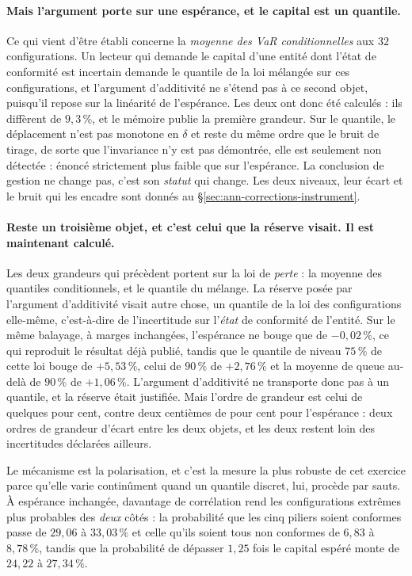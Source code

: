 \paragraph{Mais l'argument porte sur une espérance, et le capital est un quantile.} Ce qui vient
d'être établi concerne la \emph{moyenne des VaR conditionnelles} aux $32$ configurations. Un
lecteur qui demande le capital d'une entité dont l'état de conformité est incertain demande le
quantile de la loi mélangée sur ces configurations, et l'argument d'additivité ne
s'étend pas à ce second objet, puisqu'il repose sur la linéarité de l'espérance. Les deux ont
donc été calculés : ils diffèrent de $9{,}3\,\%$, et le mémoire publie la première
grandeur. Sur le quantile, le déplacement n'est pas monotone en $\delta$ et reste du même ordre
que le bruit de tirage, de sorte que l'invariance n'y est pas démontrée, elle est
seulement non détectée : énoncé strictement plus faible que sur l'espérance. La conclusion de
gestion ne change pas, c'est son \emph{statut} qui change. Les deux niveaux, leur écart et le
bruit qui les encadre sont donnés au \S\ref{sec:ann-corrections-instrument}.

\paragraph{Reste un troisième objet, et c'est celui que la réserve visait. Il est maintenant
calculé.} Les deux grandeurs qui précèdent portent sur la loi de \emph{perte} : la moyenne des
quantiles conditionnels, et le quantile du mélange. La réserve posée par l'argument d'additivité
visait autre chose, un quantile de la loi des configurations elle-même, c'est-à-dire de
l'incertitude sur l'\emph{état} de conformité de l'entité. Sur le même balayage, à marges
inchangées, l'espérance ne bouge que de $-0{,}02\,\%$, ce qui reproduit le résultat déjà publié,
tandis que le quantile de niveau $75\,\%$ de cette loi bouge de $+5{,}53\,\%$, celui de $90\,\%$
de $+2{,}76\,\%$ et la moyenne de queue au-delà de $90\,\%$ de $+1{,}06\,\%$. L'argument
d'additivité ne transporte donc pas à un quantile, et la réserve était justifiée. Mais l'ordre
de grandeur est celui de quelques pour cent, contre deux centièmes de pour cent pour l'espérance :
deux ordres de grandeur d'écart entre les deux objets, et les deux restent loin des incertitudes
déclarées ailleurs.

Le mécanisme est la polarisation, et c'est la mesure la plus robuste de cet exercice
parce qu'elle varie continûment quand un quantile discret, lui, procède par sauts. À espérance
inchangée, davantage de corrélation rend les configurations extrêmes plus probables des
\emph{deux} côtés : la probabilité que les cinq piliers soient conformes passe de $29{,}06$ à
$33{,}03\,\%$ et celle qu'ils soient tous non conformes de $6{,}83$ à $8{,}78\,\%$, tandis que la
probabilité de dépasser $1{,}25$ fois le capital espéré monte de $24{,}22$ à $27{,}34\,\%$.


